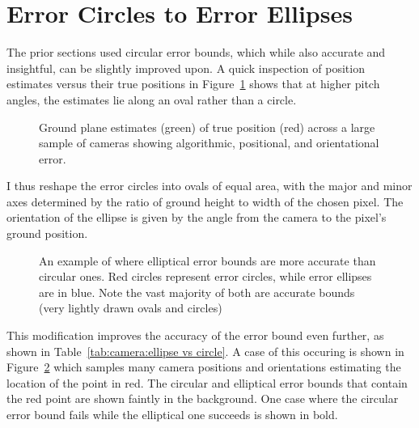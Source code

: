 \documentclass[a4paper,12pt,twoside,openright]{report}
\begin{document}
\section{Error Circles to Error Ellipses}

The prior sections used circular error bounds, which while also accurate and insightful,
can be slightly improved upon. A quick inspection of position estimates versus their true
positions in Figure~\ref{fig:camera:distributions} shows that at higher pitch angles, the estimates lie 
along an oval rather than a circle.

\begin{figure}[htb]
    \begin{center}
        
    \end{center}
    \caption[Distribution of Estimates]{Ground plane estimates (green) of true position (red) across a large sample of cameras showing algorithmic, positional, and orientational error.}
    \label{fig:camera:distributions}
\end{figure}

I thus reshape the error circles into ovals of equal area, with the major
and minor axes determined by the ratio of ground height to width of the chosen pixel.
The orientation of the ellipse is given by the angle from the camera to the pixel's
ground position.


\begin{figure}[htb]
    \begin{center}
        
    \end{center}
    \caption[elliptical versus circular error]{An example of where elliptical error bounds are more accurate than circular ones. Red circles represent error circles, while error ellipses are in blue. Note the vast majority of both are accurate bounds (very lightly drawn ovals and circles)}
    \label{fig:camera:oval better}
\end{figure}

This modification improves the accuracy of the error bound even further, as shown
in Table~\ref{tab:camera:ellipse vs circle}. A case of this occuring is shown
in Figure~\ref{fig:camera:oval better} which samples many camera positions and orientations
estimating the location of the point in red. The circular and elliptical 
error bounds that contain the red point are shown faintly in the background. One
case where the circular error bound fails while the elliptical one succeeds
is shown in bold.
\end{document}

